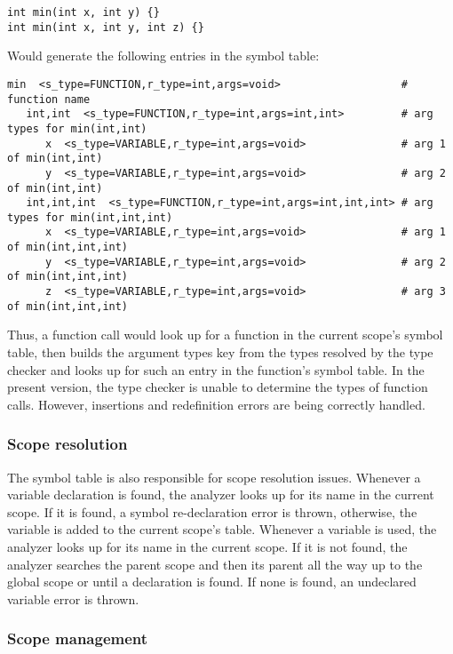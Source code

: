 \begin{lstlisting}
int min(int x, int y) {}
int min(int x, int y, int z) {}
\end{lstlisting}

Would generate the following entries in the symbol table:

\begin{lstlisting}
min  <s_type=FUNCTION,r_type=int,args=void>                   # function name
   int,int  <s_type=FUNCTION,r_type=int,args=int,int>         # arg types for min(int,int)
      x  <s_type=VARIABLE,r_type=int,args=void>               # arg 1 of min(int,int)
      y  <s_type=VARIABLE,r_type=int,args=void>               # arg 2 of min(int,int)
   int,int,int  <s_type=FUNCTION,r_type=int,args=int,int,int> # arg types for min(int,int,int)
      x  <s_type=VARIABLE,r_type=int,args=void>               # arg 1 of min(int,int,int)
      y  <s_type=VARIABLE,r_type=int,args=void>               # arg 2 of min(int,int,int)
      z  <s_type=VARIABLE,r_type=int,args=void>               # arg 3 of min(int,int,int)
\end{lstlisting}


Thus, a function call would look up for a function in the current scope's symbol table,
then builds the argument types key from the types resolved by the type checker and looks
up for such an entry in the function's symbol table. In the present version, the type checker
is unable to determine the types of function calls. However, insertions and redefinition
errors are being correctly handled.

\subsubsection{Scope resolution}

The symbol table is also responsible for scope resolution issues. Whenever a variable declaration
is found, the analyzer looks up for its name in the current scope. If it is found, a symbol
re-declaration error is thrown, otherwise, the variable is added to the current scope's table.
Whenever a variable is used, the analyzer looks up for its name in the current scope. If it is
not found, the analyzer searches the parent scope and then its parent all the way up to the global
scope or until a declaration is found. If none is found, an undeclared variable error is thrown.

\subsubsection{Scope management}


